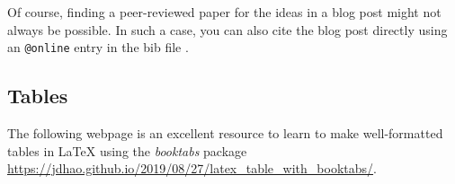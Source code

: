 \documentclass[11pt]{article}
\begin{document}
Of course, finding a peer-reviewed paper for the ideas in a blog post might not always be possible. In such a case, you can also cite the blog post directly using an \verb|@online| entry in the bib file \autocite{goodfellow2017attacking}. 


\subsection{Tables}
The following webpage is an excellent resource to learn to make well-formatted tables in LaTeX using the \emph{booktabs} package \url{https://jdhao.github.io/2019/08/27/latex_table_with_booktabs/}.


\printbibliography
\end{document}
